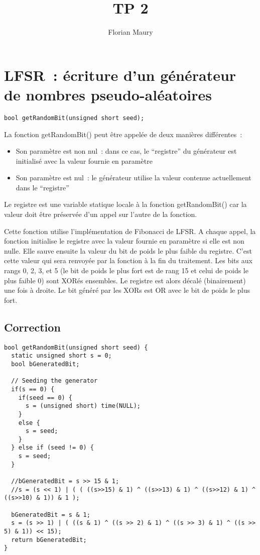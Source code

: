 \documentclass[10pt]{article}
\title{TP 2}
\author{Florian Maury}
\begin{document}
\section{LFSR~: écriture d'un générateur de nombres pseudo-aléatoires}
\begin{verbatim}
bool getRandomBit(unsigned short seed);
\end{verbatim}


La fonction getRandomBit() peut être appelée de deux manières différentes~:
\begin{itemize}
  \item Son paramètre est non nul~: dans ce cas, le ``registre'' du générateur est initialisé avec la valeur fournie en paramètre
  \item Son paramètre est nul~: le générateur utilise la valeur contenue actuellement dans le ``registre''
\end{itemize}

Le registre est une variable statique locale à la fonction getRandomBit() car la valeur doit être préservée d'un appel sur l'autre de la fonction.

Cette fonction utilise l'implémentation de Fibonacci de LFSR.
A chaque appel, la fonction initialise le registre avec la valeur fournie en paramètre si elle est non nulle.
Elle sauve ensuite la valeur du bit de poids le plus faible du registre. C'est cette valeur qui sera renvoyée par la fonction à la fin du traitement.
Les bits aux rangs 0, 2, 3, et 5 (le bit de poids le plus fort est de rang 15 et celui de poids le plus faible 0) sont XORés ensembles.
Le registre est alors décalé (binairement) une fois à droite. Le bit généré par les XORs est OR avec le bit de poids le plus fort.

\subsection{Correction}
\begin{verbatim}
bool getRandomBit(unsigned short seed) {
  static unsigned short s = 0;
  bool bGeneratedBit;

  // Seeding the generator
  if(s == 0) {
    if(seed == 0) {
      s = (unsigned short) time(NULL);
    }
    else {
      s = seed;
    }
  } else if (seed != 0) {
    s = seed;
  }
  
  //bGeneratedBit = s >> 15 & 1;
  //s = (s << 1) | ( ( ((s>>15) & 1) ^ ((s>>13) & 1) ^ ((s>>12) & 1) ^ ((s>>10) & 1)) & 1 );

  bGeneratedBit = s & 1;
  s = (s >> 1) | ( ((s & 1) ^ ((s >> 2) & 1) ^ ((s >> 3) & 1) ^ ((s >> 5) & 1)) << 15);
  return bGeneratedBit;
}
\end{verbatim}
\end{document}
